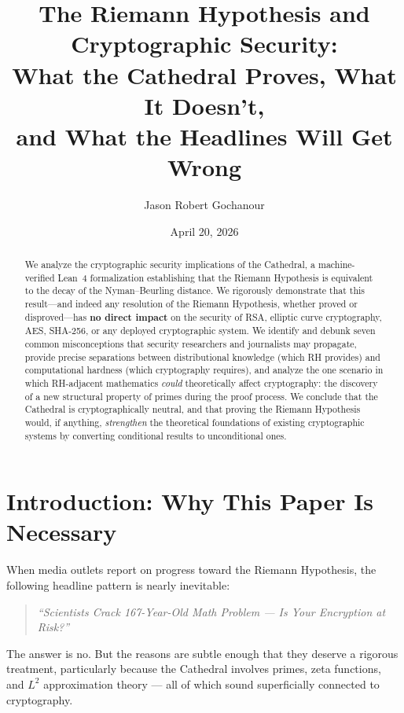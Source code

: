 \documentclass[11pt,a4paper]{article}
\title{%
  The Riemann Hypothesis and Cryptographic Security:\\
  What the Cathedral Proves, What It Doesn't,\\
  and What the Headlines Will Get Wrong%
}
\author{
  Jason Robert Gochanour
}
\date{April 20, 2026}
\begin{document}
\maketitle

\begin{abstract}
We analyze the cryptographic security implications of the Cathedral, a
machine-verified Lean~4 formalization establishing that the Riemann
Hypothesis is equivalent to the decay of the Nyman--Beurling distance.
We rigorously demonstrate that this result---and indeed any resolution
of the Riemann Hypothesis, whether proved or disproved---has
\textbf{no direct impact} on the security of RSA, elliptic curve
cryptography, AES, SHA-256, or any deployed cryptographic system.
We identify and debunk seven common misconceptions that security
researchers and journalists may propagate, provide precise
separations between distributional knowledge (which RH provides) and
computational hardness (which cryptography requires), and analyze
the one scenario in which RH-adjacent mathematics \emph{could}
theoretically affect cryptography: the discovery of a new structural
property of primes during the proof process. We conclude that the
Cathedral is cryptographically neutral, and that proving the Riemann
Hypothesis would, if anything, \emph{strengthen} the theoretical
foundations of existing cryptographic systems by converting
conditional results to unconditional ones.
\end{abstract}

\tableofcontents

\section{Introduction: Why This Paper Is Necessary}

When media outlets report on progress toward the Riemann Hypothesis,
the following headline pattern is nearly inevitable:

\begin{quote}
\emph{``Scientists Crack 167-Year-Old Math Problem --- Is Your
Encryption at Risk?''}
\end{quote}

The answer is no. But the reasons are subtle enough that they deserve
a rigorous treatment, particularly because the Cathedral involves
primes, zeta functions, and $L^2$ approximation theory --- all of
which sound superficially connected to cryptography.
\end{document}
